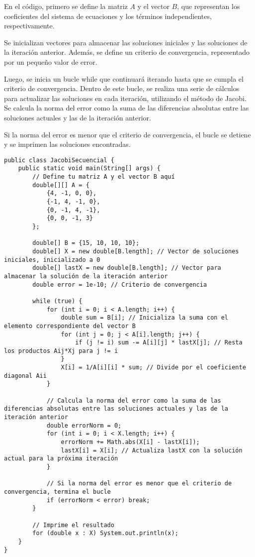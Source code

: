 \documentclass[]{article}
\begin{document}
En el código, primero se define la matriz $A$ y el vector $B$, que representan los coeficientes del sistema de ecuaciones y los términos independientes, respectivamente.

Se inicializan vectores para almacenar las soluciones iniciales y las soluciones de la iteración anterior. Además, se define un criterio de convergencia, representado por un pequeño valor de error.

Luego, se inicia un bucle while que continuará iterando hasta que se cumpla el criterio de convergencia. Dentro de este bucle, se realiza una serie de cálculos para actualizar las soluciones en cada iteración, utilizando el método de Jacobi. Se calcula la norma del error como la suma de las diferencias absolutas entre las soluciones actuales y las de la iteración anterior.

Si la norma del error es menor que el criterio de convergencia, el bucle se detiene y se imprimen las soluciones encontradas.



\begin{verbatim}
public class JacobiSecuencial {
    public static void main(String[] args) {
        // Define tu matriz A y el vector B aquí
        double[][] A = {
            {4, -1, 0, 0},
            {-1, 4, -1, 0},
            {0, -1, 4, -1},
            {0, 0, -1, 3}
        };
        
        double[] B = {15, 10, 10, 10};
        double[] X = new double[B.length]; // Vector de soluciones iniciales, inicializado a 0
        double[] lastX = new double[B.length]; // Vector para almacenar la solución de la iteración anterior
        double error = 1e-10; // Criterio de convergencia

        while (true) {
            for (int i = 0; i < A.length; i++) {
                double sum = B[i]; // Inicializa la suma con el elemento correspondiente del vector B
                for (int j = 0; j < A[i].length; j++) {
                    if (j != i) sum -= A[i][j] * lastX[j]; // Resta los productos Aij*Xj para j != i
                }
                X[i] = 1/A[i][i] * sum; // Divide por el coeficiente diagonal Aii
            }

            // Calcula la norma del error como la suma de las diferencias absolutas entre las soluciones actuales y las de la iteración anterior
            double errorNorm = 0;
            for (int i = 0; i < X.length; i++) {
                errorNorm += Math.abs(X[i] - lastX[i]);
                lastX[i] = X[i]; // Actualiza lastX con la solución actual para la próxima iteración
            }

            // Si la norma del error es menor que el criterio de convergencia, termina el bucle
            if (errorNorm < error) break;
        }

        // Imprime el resultado
        for (double x : X) System.out.println(x);
    }
}
\end{verbatim}
\end{document}
